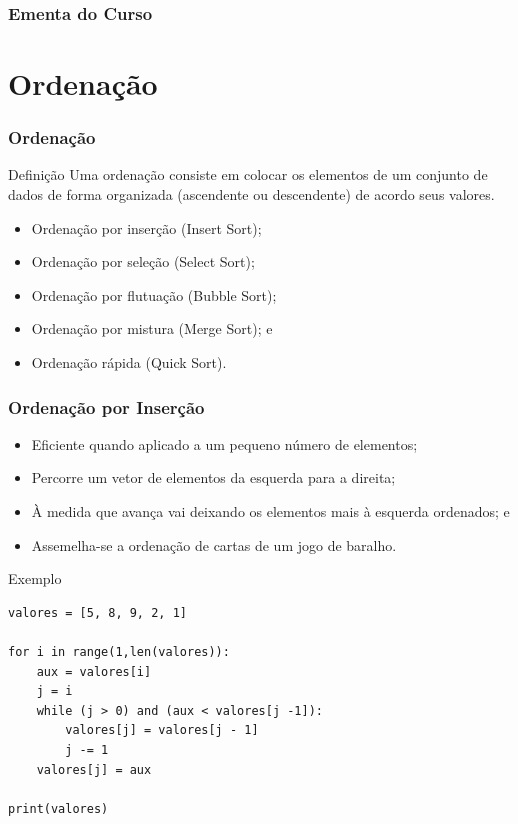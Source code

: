 \documentclass{beamer}
\begin{document}
\begin{frame}
	\frametitle{Ementa do Curso}
  	\tableofcontents
\end{frame}


\section{Ordenação}

\begin{frame}
\frametitle{Ordenação}

\begin{block}{Definição}
Uma ordenação consiste em colocar os elementos de um conjunto de dados
de forma organizada (ascendente ou descendente) de acordo seus valores.
\end{block}\vfill

\begin{itemize}
	\item Ordenação por inserção (Insert Sort);
	\item Ordenação por seleção (Select Sort);
	\item Ordenação por flutuação (Bubble Sort);
	\item Ordenação por mistura (Merge Sort); e
	\item Ordenação rápida (Quick Sort).
\end{itemize}

\end{frame}

\begin{frame}[fragile]
	\frametitle{Ordenação por Inserção}
	
	\begin{itemize}
		\item Eficiente quando aplicado a um pequeno número de elementos;
		\item Percorre um vetor de elementos da esquerda para a direita;
		\item À medida que avança vai deixando os elementos mais à esquerda
		ordenados; e
		\item Assemelha-se a ordenação de cartas de um jogo de baralho.
	\end{itemize}
	
	\begin{exampleblock}{Exemplo}
		\begin{lstlisting}
valores = [5, 8, 9, 2, 1]

for i in range(1,len(valores)):
    aux = valores[i]
    j = i
    while (j > 0) and (aux < valores[j -1]):
        valores[j] = valores[j - 1] 
        j -= 1
    valores[j] = aux

print(valores)
		\end{lstlisting}
	\end{exampleblock}
\end{frame}
\end{document}
